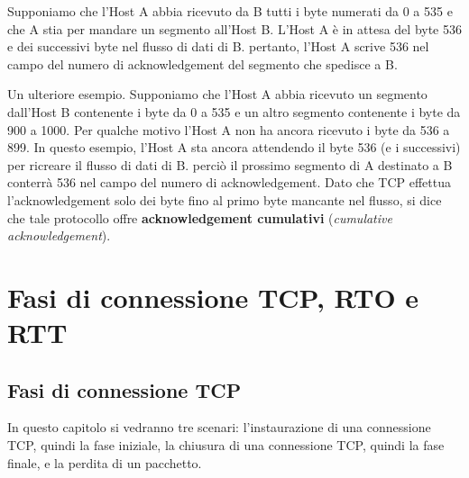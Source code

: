 \documentclass[a4paper]{article}
\begin{document}
	\noindent
	Supponiamo che l’Host A abbia ricevuto da B tutti i byte numerati da 0 a 535 e che A stia per mandare un segmento all’Host B. L’Host A è in attesa del byte 536 e dei successivi byte nel flusso di dati di B. pertanto, l’Host A scrive 536 nel campo del numero di acknowledgement del segmento che spedisce a B.\newline
	
	\noindent
	Un ulteriore esempio. Supponiamo che l’Host A abbia ricevuto un segmento dall’Host B contenente i byte da 0 a 535 e un altro segmento contenente i byte da 900 a 1000. Per qualche motivo l’Host A non ha ancora ricevuto i byte da 536 a 899. In questo esempio, l’Host A sta ancora attendendo il byte 536 (e i successivi) per ricreare il flusso di dati di B. perciò il prossimo segmento di A destinato a B conterrà 536 nel campo del numero di acknowledgement. Dato che TCP effettua l’acknowledgement solo dei byte fino al primo byte mancante nel flusso, si dice che tale protocollo offre \textbf{acknowledgement cumulativi} (\emph{cumulative acknowledgement}).
	
	\newpage
	
	\section{Fasi di connessione TCP, RTO e RTT}
	
	\subsection{Fasi di connessione TCP}
	
	In questo capitolo si vedranno tre scenari: l’instaurazione di una connessione TCP, quindi la fase iniziale, la chiusura di una connessione TCP, quindi la fase finale, e la perdita di un pacchetto.\newline
	
\end{document}
